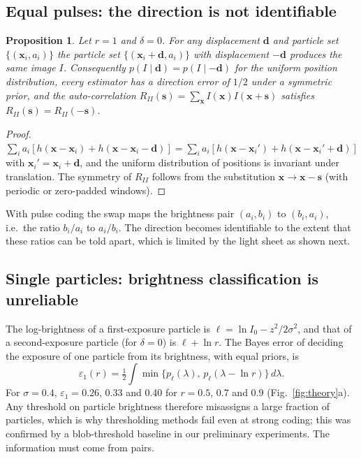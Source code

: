 \documentclass[11pt]{article}
\newtheorem{proposition}{Proposition}
\theoremstyle{remark}
\newcommand{\x}{\mathbf{x}}
\newcommand{\s}{\mathbf{s}}
\newcommand{\dd}{\mathbf{d}}
\begin{document}
\subsection{Equal pulses: the direction is not identifiable}
\begin{proposition}\label{prop:ambig}
Let $r=1$ and $\delta=0$. For any displacement $\dd$ and particle set $\{(\x_i,a_i)\}$ the particle set $\{(\x_i+\dd,a_i)\}$ with displacement $-\dd$ produces the same image $I$. Consequently $p(I\mid\dd)=p(I\mid-\dd)$ for the uniform position distribution, every estimator has a direction error of $1/2$ under a symmetric prior, and the auto-correlation $R_{II}(\s)=\sum_\x I(\x)I(\x+\s)$ satisfies $R_{II}(\s)=R_{II}(-\s)$.
\end{proposition}
\begin{proof}
$\sum_i a_i[h(\x-\x_i)+h(\x-\x_i-\dd)]=\sum_i a_i[h(\x-\x_i')+h(\x-\x_i'+\dd)]$ with $\x_i'=\x_i+\dd$, and the uniform distribution of positions is invariant under translation. The symmetry of $R_{II}$ follows from the substitution $\x\to\x-\s$ (with periodic or zero-padded windows).
\end{proof}
With pulse coding the swap maps the brightness pair $(a_i,b_i)$ to $(b_i,a_i)$, i.e.\ the ratio $b_i/a_i$ to $a_i/b_i$. The direction becomes identifiable to the extent that these ratios can be told apart, which is limited by the light sheet as shown next.

\subsection{Single particles: brightness classification is unreliable}
The log-brightness of a first-exposure particle is $\ell=\ln I_0-z^2/2\sigma^2$, and that of a second-exposure particle (for $\delta=0$) is $\ell+\ln r$.
The Bayes error of deciding the exposure of one particle from its brightness, with equal priors, is
\begin{equation}
\varepsilon_1(r)=\tfrac12\int\min\{p_\ell(\lambda),\,p_\ell(\lambda-\ln r)\}\,d\lambda .
\end{equation}
For $\sigma=0.4$, $\varepsilon_1=0.26$, 0.33 and 0.40 for $r=0.5$, 0.7 and 0.9 (Fig.~\ref{fig:theory}a).
Any threshold on particle brightness therefore misassigns a large fraction of particles, which is why thresholding methods fail even at strong coding; this was confirmed by a blob-threshold baseline in our preliminary experiments.
The information must come from pairs.
\end{document}
